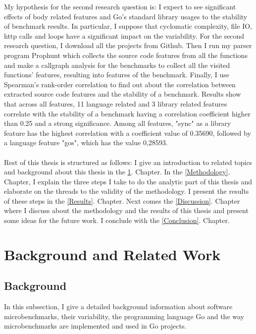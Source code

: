 \documentclass{seal_thesis}
\begin{document}
\noindent My hypothesis for the second research question is: I expect to see significant effects of body related features and Go's standard library usages to the stability of benchmark results. In particular, I suppose that cyclomatic complexity, file IO, http calls and loops have a significant impact on the variability. For the second research question, I download all the projects from Github. Then I run my parser program Prophunt which collects the source code features from all the functions and make a callgraph analysis for the benchmarks to collect all the visited functions' features, resulting into features of the benchmark. Finally, I use Spearman's rank-order correlation to find out about the correlation between extracted source code features and the stability of a benchmark. Results show that across all features, 11 language related and 3 library related features correlate with the stability of a benchmark having a correlation coefficient higher than 0.25 and a strong significance. Among all features, "sync" as a library feature has the highest correlation with a coefficient value of 0.35690, followed by a language feature "gos", which has the value 0,28593.\\
\\
Rest of this thesis is structured as follows: I give an introduction to related topics and background about this thesis in the \ref{Background and Related Work}. Chapter. In the \ref{Methodology}. Chapter, I explain the three steps I take to do the analytic part of this thesis and elaborate on the threads to the validity of the methodology. I present the results of these steps in the \ref{Results}. Chapter. Next comes the \ref{Discussion}. Chapter where I discuss about the methodology and the results of this thesis and present some ideas for the future work. I conclude with the \ref{Conclusion}. Chapter.

\chapter{Background and Related Work}
\label{Background and Related Work}

\section{Background}

In this subsection, I give a detailed background information about software microbenchmarks, their variability, the programming language Go and the way microbenchmarks are implemented and used in Go projects.
\end{document}
